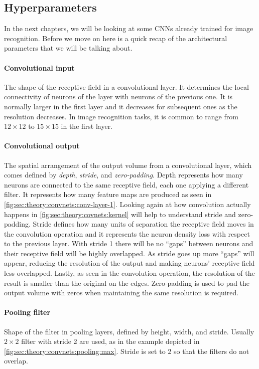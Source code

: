 \subsection{Hyperparameters}
\label{sub:theory:convnets:achitecture}

In the next chapters, we will be looking at some CNNs already trained for image recognition.
Before we move on here is a quick recap of the architectural parameters that we will be talking about.

\paragraph{Convolutional input}
The shape of the receptive field in a convolutional layer.
It determines the local connectivity of neurons of the layer with neurons of the previous one.
It is normally larger in the first layer and it decreases for subsequent ones as the resolution decreases.
In image recognition tasks, it is common to range from ${12}\times{12}$ to ${15}\times{15}$ in the first layer.

\paragraph{Convolutional output}
The spatial arrangement of the output volume from a convolutional layer, which comes defined by \emph{depth}, \emph{stride}, and \emph{zero-padding}.
Depth represents how many neurons are connected to the same receptive field, each one applying a different filter.
It represents how many feature maps are produced as seen in \autoref{fig:sec:theory:convnets:conv-layer-1}.
Looking again at how convolution actually happens in \autoref{fig:sec:theory:covnets:kernel} will help to understand stride and zero-padding.
Stride defines how many units of separation the receptive field moves in the convolution operation and it represents the neuron density loss with respect to the previous layer.
With stride 1 there will be no ``gaps'' between neurons and their receptive field will be highly overlapped.
As stride goes up more ``gaps'' will appear, reducing the resolution of the output and making neurons' receptive field less overlapped.
Lastly, as seen in the convolution operation, the resolution of the result is smaller than the original on the edges.
Zero-padding is used to pad the output volume with zeros when maintaining the same resolution is required.

\paragraph{Pooling filter}
Shape of the filter in pooling layers, defined by height, width, and stride.
Usually ${2}\times{2}$ filter with stride 2 are used, as in the example depicted in \autoref{fig:sec:theory:convnets:pooling:max}.
Stride is set to 2 so that the filters do not overlap.
